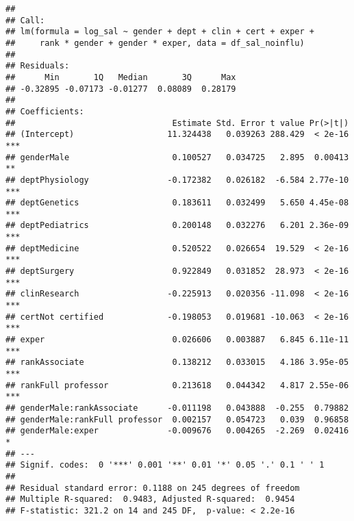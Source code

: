 \documentclass[]{article}
\begin{document}
\begin{verbatim}
## 
## Call:
## lm(formula = log_sal ~ gender + dept + clin + cert + exper + 
##     rank * gender + gender * exper, data = df_sal_noinflu)
## 
## Residuals:
##      Min       1Q   Median       3Q      Max 
## -0.32895 -0.07173 -0.01277  0.08089  0.28179 
## 
## Coefficients:
##                                Estimate Std. Error t value Pr(>|t|)    
## (Intercept)                   11.324438   0.039263 288.429  < 2e-16 ***
## genderMale                     0.100527   0.034725   2.895  0.00413 ** 
## deptPhysiology                -0.172382   0.026182  -6.584 2.77e-10 ***
## deptGenetics                   0.183611   0.032499   5.650 4.45e-08 ***
## deptPediatrics                 0.200148   0.032276   6.201 2.36e-09 ***
## deptMedicine                   0.520522   0.026654  19.529  < 2e-16 ***
## deptSurgery                    0.922849   0.031852  28.973  < 2e-16 ***
## clinResearch                  -0.225913   0.020356 -11.098  < 2e-16 ***
## certNot certified             -0.198053   0.019681 -10.063  < 2e-16 ***
## exper                          0.026606   0.003887   6.845 6.11e-11 ***
## rankAssociate                  0.138212   0.033015   4.186 3.95e-05 ***
## rankFull professor             0.213618   0.044342   4.817 2.55e-06 ***
## genderMale:rankAssociate      -0.011198   0.043888  -0.255  0.79882    
## genderMale:rankFull professor  0.002157   0.054723   0.039  0.96858    
## genderMale:exper              -0.009676   0.004265  -2.269  0.02416 *  
## ---
## Signif. codes:  0 '***' 0.001 '**' 0.01 '*' 0.05 '.' 0.1 ' ' 1
## 
## Residual standard error: 0.1188 on 245 degrees of freedom
## Multiple R-squared:  0.9483, Adjusted R-squared:  0.9454 
## F-statistic: 321.2 on 14 and 245 DF,  p-value: < 2.2e-16
\end{verbatim}
\end{document}
